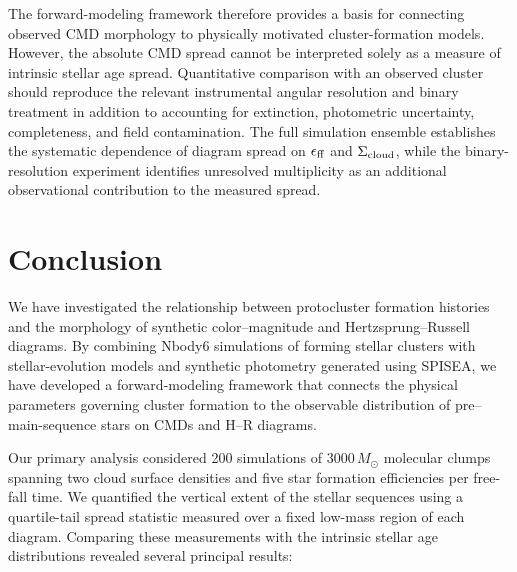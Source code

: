 \documentclass[linenumbers, twocolumn]{aastex631}
\begin{document}
The forward-modeling framework therefore provides a basis for connecting observed CMD morphology to physically motivated cluster-formation models. However, the absolute CMD spread cannot be interpreted solely as a measure of intrinsic stellar age spread. Quantitative comparison with an observed cluster should reproduce the relevant instrumental angular resolution and binary treatment in addition to accounting for extinction, photometric uncertainty, completeness, and field contamination. The full simulation ensemble establishes the systematic dependence of diagram spread on $\epsilon_{\rm ff}$ and $\Sigma_{\rm cloud}$, while the binary-resolution experiment identifies unresolved multiplicity as an additional observational contribution to the measured spread.





\section{Conclusion}
\label{sec:conclusion}

We have investigated the relationship between protocluster formation histories and the morphology of synthetic color--magnitude and Hertzsprung--Russell diagrams. By combining Nbody6 simulations of forming stellar clusters with stellar-evolution models and synthetic photometry generated using SPISEA, we have developed a forward-modeling framework that connects the physical parameters governing cluster formation to the observable distribution of pre--main-sequence stars on CMDs and H--R diagrams.

Our primary analysis considered 200 simulations of $3000\,M_\odot$ molecular clumps spanning two cloud surface densities and five star formation efficiencies per free-fall time. We quantified the vertical extent of the stellar sequences using a quartile-tail spread statistic measured over a fixed low-mass region of each diagram. Comparing these measurements with the intrinsic stellar age distributions revealed several principal results:
\end{document}
